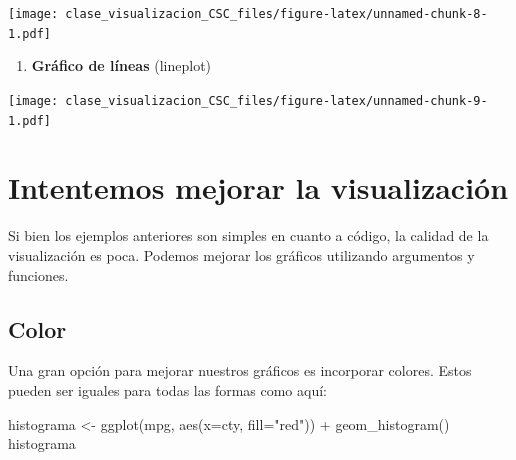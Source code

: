 \documentclass[
]{book}
\newenvironment{Shaded}{\begin{snugshade}}{\end{snugshade}}
\newcommand{\AttributeTok}[1]{\textcolor[rgb]{0.77,0.63,0.00}{#1}}
\newcommand{\CommentTok}[1]{\textcolor[rgb]{0.56,0.35,0.01}{\textit{#1}}}
\newcommand{\FunctionTok}[1]{\textcolor[rgb]{0.00,0.00,0.00}{#1}}
\newcommand{\NormalTok}[1]{#1}
\newcommand{\OtherTok}[1]{\textcolor[rgb]{0.56,0.35,0.01}{#1}}
\newcommand{\SpecialCharTok}[1]{\textcolor[rgb]{0.00,0.00,0.00}{#1}}
\newcommand{\StringTok}[1]{\textcolor[rgb]{0.31,0.60,0.02}{#1}}
\providecommand{\tightlist}{%
  \setlength{\itemsep}{0pt}\setlength{\parskip}{0pt}}
\begin{document}
\texttt{[image: clase\_visualizacion\_CSC\_files/figure-latex/unnamed-chunk-8-1.pdf]}

\begin{enumerate}
\def\labelenumi{\arabic{enumi}.}
\setcounter{enumi}{4}
\tightlist
\item
  \textbf{Gráfico de líneas} (lineplot)
\end{enumerate}

\begin{Shaded}
\end{Shaded}

\texttt{[image: clase\_visualizacion\_CSC\_files/figure-latex/unnamed-chunk-9-1.pdf]}

\hypertarget{intentemos-mejorar-la-visualizaciuxf3n}{%
\section{Intentemos mejorar la visualización}\label{intentemos-mejorar-la-visualizaciuxf3n}}

Si bien los ejemplos anteriores son simples en cuanto a código, la calidad de la visualización es poca. Podemos mejorar los gráficos utilizando argumentos y funciones.

\hypertarget{color}{%
\subsection{Color}\label{color}}

Una gran opción para mejorar nuestros gráficos es incorporar colores. Estos pueden ser iguales para todas las formas como aquí:

\begin{Shaded}
\begin{Highlighting}[]
\NormalTok{histograma }\OtherTok{\textless{}{-}} \FunctionTok{ggplot}\NormalTok{(mpg, }\FunctionTok{aes}\NormalTok{(}\AttributeTok{x=}\NormalTok{cty, }\AttributeTok{fill=}\StringTok{"red"}\NormalTok{)) }\SpecialCharTok{+} 
  \FunctionTok{geom\_histogram}\NormalTok{()}
\NormalTok{histograma}
\end{Highlighting}
\end{Shaded}
\end{document}
